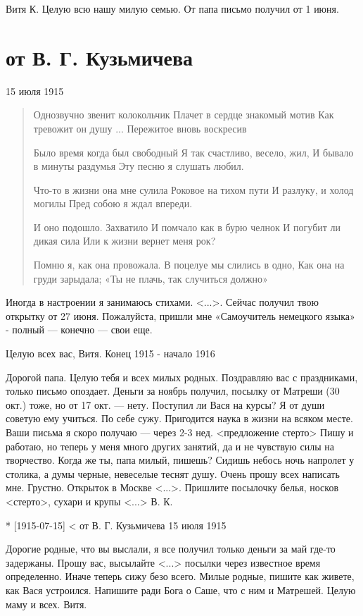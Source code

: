 \documentclass[]{memoir}
\begin{document}
Витя К.
Целую всю нашу милую семью. От папа письмо получил от 1 июня.

\section{от В. Г. Кузьмичева}

15 июля 1915

\begin{verse}
Однозвучно звенит колокольчик
Плачет в сердце знакомый мотив
Как тревожит он душу ...
Пережитое вновь воскресив

Было время когда был свободный
Я так счастливо, весело, жил,
И бывало в минуты раздумья
Эту песню я слушать любил.

Что-то в жизни она мне сулила
Роковое на тихом пути
И разлуку, и холод могилы
Пред собою я ждал впереди.

И оно подошло. Захватило
И помчало как в бурю челнок
И погубит ли дикая сила
Или к жизни вернет меня рок?

Помню я, как она провожала.
В поцелуе мы слились в одно,
Как она на груди зарыдала;
«Ты не плачь, так случиться должно»
\end{verse}

Иногда в настроении я занимаюсь стихами. <...>. Сейчас получил твою открытку от 27 июня. Пожалуйста, пришли мне «Самоучитель немецкого языка» - полный — конечно — свои еще.

Целую всех вас, Витя.
Конец 1915 - начало 1916

Дорогой папа. Целую тебя и всех милых родных. Поздравляю вас с праздниками, только письмо опоздает. Деньги за ноябрь получил, посылку от Матреши (30 окт.) тоже, но от 17 окт. — нету. Поступил ли Вася на курсы? Я от души советую ему учиться. По себе сужу. Пригодится наука в жизни на всяком месте. Ваши письма я скоро получаю — через 2-3 нед. <предложение стерто>
Пишу и работаю, но теперь у меня много других занятий, да и не чувствую силы на творчество. Когда же ты, папа милый, пишешь? Сидишь небось ночь напролет у столика, а думы черные, невеселые теснят душу. Очень прошу всех написать мне. Грустно. Открыток в Москве <...>.
Пришлите посылочку белья, носков <стерто>, сухари и крупы <...> В. К.



* [1915-07-15] < от В. Г. Кузьмичева 
15 июля 1915

Дорогие родные, что вы выслали, я все получил только деньги за май где-то задержаны. Прошу вас, высылайте <...> посылки через известное время определенно. Иначе теперь сижу безо всего. Милые родные, пишите как живете, как Вася устроился. Напишите ради Бога о Саше, что с ним и Матрешей. Целую маму и всех. Витя.
\end{document}
